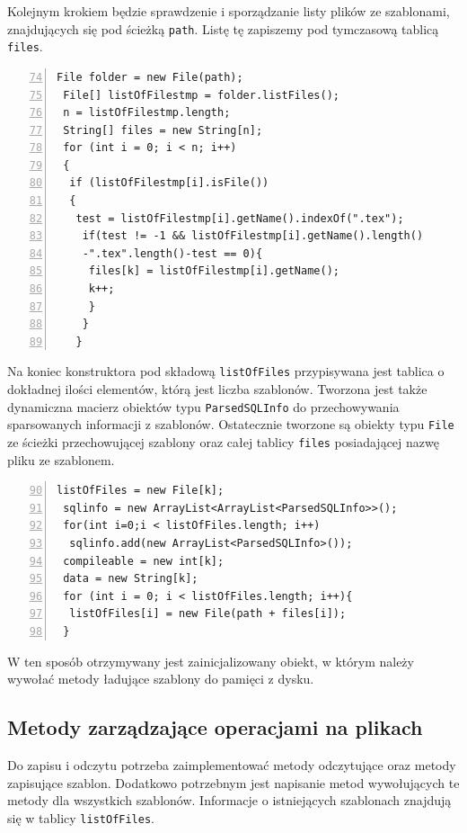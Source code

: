     
    Kolejnym krokiem będzie sprawdzenie i sporządzanie listy plików ze szablonami, znajdujących się pod ścieżką \texttt{path}. Listę tę zapiszemy pod tymczasową tablicą  \texttt{files}.
 \begin{lstlisting}[numbers=left,firstnumber=74]
 File folder = new File(path);
 File[] listOfFilestmp = folder.listFiles(); 
 n = listOfFilestmp.length;
 String[] files = new String[n];
 for (int i = 0; i < n; i++) 
 {
  if (listOfFilestmp[i].isFile()) 
  {
   test = listOfFilestmp[i].getName().indexOf(".tex");
    if(test != -1 && listOfFilestmp[i].getName().length()
    -".tex".length()-test == 0){
     files[k] = listOfFilestmp[i].getName();
     k++;
     }
    }
   }
\end{lstlisting}


Na koniec konstruktora pod składową \texttt{listOfFiles} przypisywana jest tablica o dokładnej ilości elementów, którą jest liczba szablonów. Tworzona jest także dynamiczna macierz obiektów typu \texttt{ParsedSQLInfo} do przechowywania sparsowanych informacji z szablonów. Ostatecznie tworzone są obiekty typu \texttt{File} ze ścieżki przechowującej szablony oraz całej tablicy \texttt{files} posiadającej nazwę pliku ze szablonem.
    
 \begin{lstlisting}[numbers=left,firstnumber=90]
 listOfFiles = new File[k];
 sqlinfo = new ArrayList<ArrayList<ParsedSQLInfo>>();
 for(int i=0;i < listOfFiles.length; i++)
  sqlinfo.add(new ArrayList<ParsedSQLInfo>());
 compileable = new int[k];
 data = new String[k];
 for (int i = 0; i < listOfFiles.length; i++){
  listOfFiles[i] = new File(path + files[i]);
 }
\end{lstlisting}
  
  W ten sposób otrzymywany jest zainicjalizowany obiekt, w którym należy wywołać metody ładujące szablony do pamięci z dysku.
  
  
\subsection{Metody zarządzające operacjami na plikach}

Do zapisu i odczytu potrzeba zaimplementować metody odczytujące oraz metody zapisujące szablon. Dodatkowo potrzebnym jest napisanie metod wywołujących te metody dla wszystkich szablonów. Informacje o istniejących szablonach znajdują się w tablicy \texttt{listOfFiles}. \\
\par

